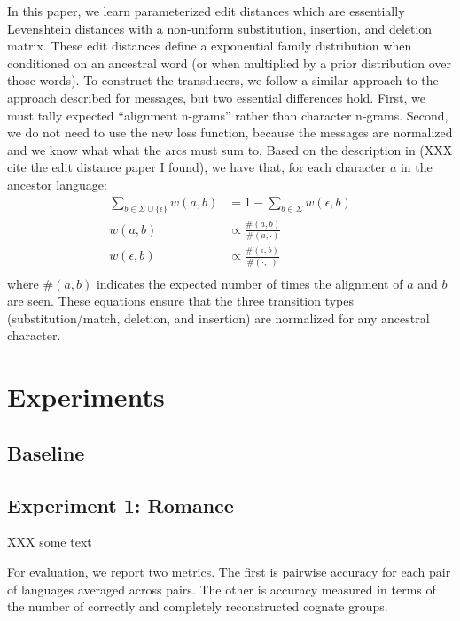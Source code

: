 \documentclass[11pt,a4paper]{article}
\begin{document}
In this paper, we learn parameterized edit distances which are
essentially Levenshtein distances with a non-uniform substitution,
insertion, and deletion matrix. These edit distances define a
exponential family distribution when conditioned on an ancestral
word (or when multiplied by a prior distribution over those words).
To construct the transducers, we follow a similar approach to the
approach described for messages, but two essential differences hold.
First, we must tally expected ``alignment n-grams'' rather than
character n-grams. Second, we do not need to use the new loss
function, because the messages are normalized and we know what what
the arcs must sum to. Based on the description in (XXX cite the
edit distance paper I found), we have that, for each character $a$
in the ancestor language:
\begin{equation}
  \begin{split}
    \sum_{b \in \Sigma \cup \{\epsilon\}} w(a,b) &= 1 - \sum_{b \in \Sigma} w(\epsilon,b) \\
    w(a,b) &\propto \frac{\#(a,b)}{\#(a,\cdot)} \\
    w(\epsilon,b) &\propto \frac{\#(\epsilon,b)}{\#(\cdot,\cdot)} \\
   \end{split}
 \end{equation}
where $\#(a,b)$ indicates the expected number of times the alignment
of $a$ and $b$ are seen. These equations ensure that the three transition
types (substitution/match, deletion, and insertion) are normalized for
any ancestral character.

\section{Experiments}

\subsection{Baseline}

\subsection{Experiment 1: Romance}

XXX some text


For evaluation, we report two metrics. The first is pairwise accuracy
for each pair of languages averaged across pairs. The other
is accuracy measured in terms of the number of correctly and
completely reconstructed cognate groups. 
\end{document}
